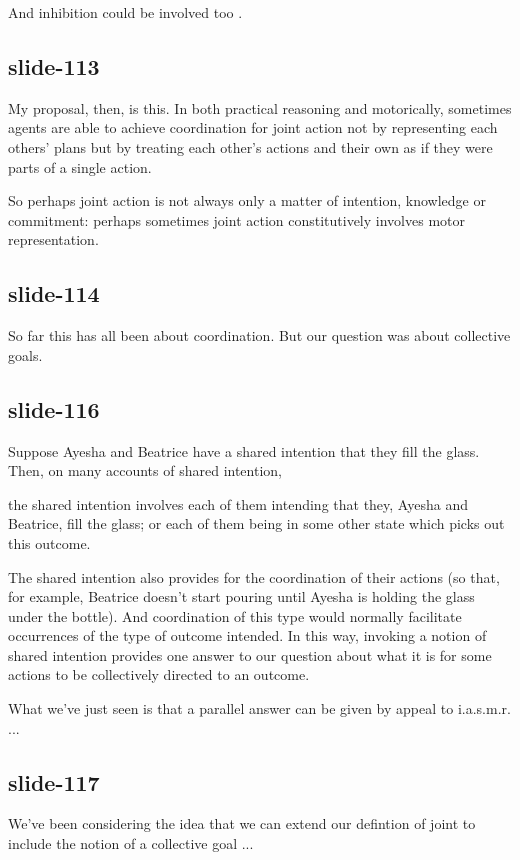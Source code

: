 \documentclass[12pt,\papersize]{extarticle}
\begin{document}
And inhibition could be involved too \citep[compare][]{sebanz:2006_twin_peaks}.

\subsection{slide-113}
My proposal, then, is this.
In both practical reasoning and motorically, sometimes agents are able to achieve coordination
 for joint action not by representing each others’ plans but
 by treating each other's actions and their own as if they were parts of a single action.

So perhaps joint action is not always only a matter of intention, knowledge or commitment:
perhaps sometimes joint action constitutively involves motor representation.

\subsection{slide-114}
So far this has all been about coordination.
But our question was about collective goals.

\subsection{slide-116}
Suppose Ayesha and Beatrice have a shared intention that they fill the glass.
Then, on many accounts of shared intention,

the shared intention involves each of them intending that they, Ayesha and Beatrice, fill the glass;
or each of them being in some other state which picks out this outcome.

The shared intention also provides for the coordination of their actions (so that, for example,
Beatrice doesn't start pouring until Ayesha is holding the glass under the bottle).  And
coordination of this type would normally facilitate occurrences of the type of outcome intended.
In this way, invoking a notion of shared intention provides one answer to our question about what
it is for some actions to be collectively directed to an outcome.

What we've just seen is that a parallel answer can be given by appeal to i.a.s.m.r. ...

\subsection{slide-117}
We’ve been considering the idea that we can extend our defintion of joint to include the notion
of a collective goal ...
\end{document}
